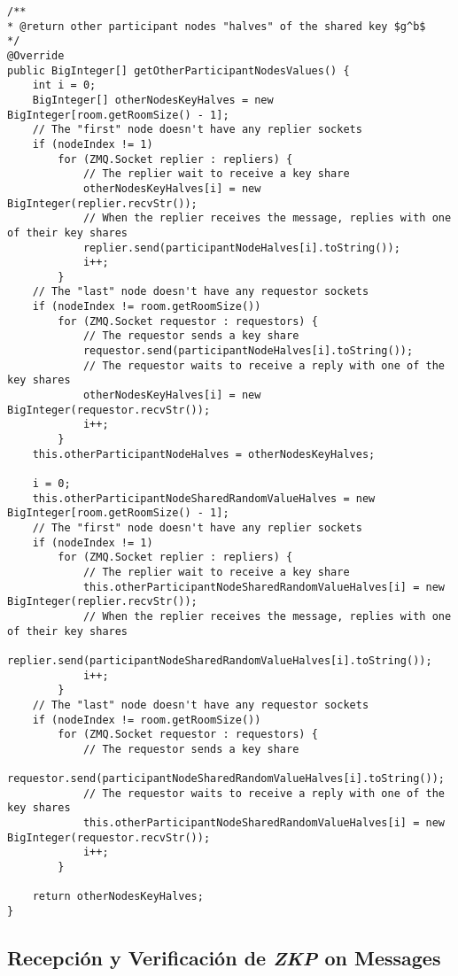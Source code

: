 \begin{verbatim}
/**
* @return other participant nodes "halves" of the shared key $g^b$
*/
@Override
public BigInteger[] getOtherParticipantNodesValues() {
    int i = 0;
    BigInteger[] otherNodesKeyHalves = new BigInteger[room.getRoomSize() - 1];
    // The "first" node doesn't have any replier sockets
    if (nodeIndex != 1)
        for (ZMQ.Socket replier : repliers) {
            // The replier wait to receive a key share
            otherNodesKeyHalves[i] = new BigInteger(replier.recvStr());
            // When the replier receives the message, replies with one of their key shares
            replier.send(participantNodeHalves[i].toString());
            i++;
        }
    // The "last" node doesn't have any requestor sockets
    if (nodeIndex != room.getRoomSize())
        for (ZMQ.Socket requestor : requestors) {
            // The requestor sends a key share
            requestor.send(participantNodeHalves[i].toString());
            // The requestor waits to receive a reply with one of the key shares
            otherNodesKeyHalves[i] = new BigInteger(requestor.recvStr());
            i++;
        }
    this.otherParticipantNodeHalves = otherNodesKeyHalves;

    i = 0;
    this.otherParticipantNodeSharedRandomValueHalves = new BigInteger[room.getRoomSize() - 1];
    // The "first" node doesn't have any replier sockets
    if (nodeIndex != 1)
        for (ZMQ.Socket replier : repliers) {
            // The replier wait to receive a key share
            this.otherParticipantNodeSharedRandomValueHalves[i] = new BigInteger(replier.recvStr());
            // When the replier receives the message, replies with one of their key shares
            replier.send(participantNodeSharedRandomValueHalves[i].toString());
            i++;
        }
    // The "last" node doesn't have any requestor sockets
    if (nodeIndex != room.getRoomSize())
        for (ZMQ.Socket requestor : requestors) {
            // The requestor sends a key share
            requestor.send(participantNodeSharedRandomValueHalves[i].toString());
            // The requestor waits to receive a reply with one of the key shares
            this.otherParticipantNodeSharedRandomValueHalves[i] = new BigInteger(requestor.recvStr());
            i++;
        }

    return otherNodesKeyHalves;
}
\end{verbatim}

\subsection{Recepción y Verificación de \emph{ZKP} on Messages}

